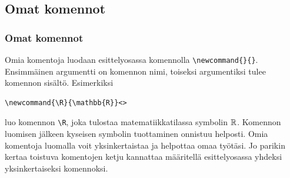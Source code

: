 \subsection{Omat komennot}
\begin{frame}[fragile]
    \frametitle{Omat komennot}
    Omia komentoja luodaan esittelyosassa komennolla \lstinline-\newcommand{}{}-. Ensimmäinen argumentti on komennon nimi, toiseksi argumentiksi tulee komennon sisältö. Esimerkiksi
    \begin{lstlisting}
\newcommand{\R}{\mathbb{R}}<>
    \end{lstlisting}
    luo komennon \lstinline-\R-, joka tulostaa matematiikkatilassa symbolin \(\R\). Komennon luomisen jälkeen kyseisen symbolin tuottaminen onnistuu helposti.
    \vaihto
    Omia komentoja luomalla voit yksinkertaistaa ja helpottaa omaa työtäsi. Jo parikin kertaa toistuva komentojen ketju kannattaa määritellä esittelyosassa yhdeksi yksinkertaiseksi komennoksi.
\end{frame}

\begin{frame}[fragile]
    
\end{frame}

